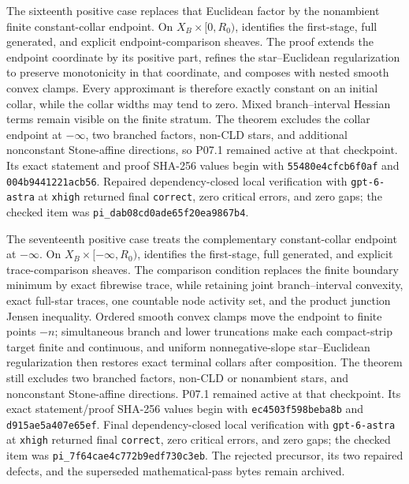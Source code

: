 The sixteenth positive case replaces that Euclidean factor by the
nonambient finite constant-collar endpoint.  On
\(X_B\times[0,R_0)\),
 identifies the
first-stage, full generated, and explicit endpoint-comparison sheaves.  The
proof extends the endpoint coordinate by its positive part, refines the
star--Euclidean regularization to preserve monotonicity in that coordinate,
and composes with nested smooth convex clamps.  Every approximant is
therefore exactly constant on an initial collar, while the collar widths may
tend to zero.  Mixed branch--interval Hessian terms remain visible on the
finite stratum.  The theorem excludes the collar endpoint at \(-\infty\), two
branched factors, non-CLD stars, and additional nonconstant Stone-affine
directions, so P07.1 remained active at that checkpoint.  Its exact statement and proof SHA-256
values begin with \texttt{55480e4cfcb6f0af} and
\texttt{004b9441221acb56}.  Repaired dependency-closed local verification
with \texttt{gpt-6-astra} at \texttt{xhigh} returned final
\texttt{correct}, zero critical errors, and zero gaps; the checked item was
\nolinkurl{pi_dab08cd0ade65f20ea9867b4}.

The seventeenth positive case treats the complementary constant-collar
endpoint at \(-\infty\).  On \(X_B\times[-\infty,R_0)\),
 identifies
the first-stage, full generated, and explicit trace-comparison sheaves.  The
comparison condition replaces the finite boundary minimum by exact
fibrewise trace, while retaining joint branch--interval convexity, exact
full-star traces, one countable node activity set, and the product junction
Jensen inequality.  Ordered smooth convex clamps move the endpoint to
finite points \(-n\); simultaneous branch and lower truncations make each
compact-strip target finite and continuous, and uniform nonnegative-slope
star--Euclidean regularization then restores exact terminal collars after
composition.  The theorem still excludes two branched factors, non-CLD or
nonambient stars, and nonconstant Stone-affine directions.  P07.1 remained active at that checkpoint.  Its exact statement/proof SHA-256 values begin with
\texttt{ec4503f598beba8b} and \texttt{d915ae5a407e65ef}.
Final dependency-closed local verification with \texttt{gpt-6-astra} at
\texttt{xhigh} returned final \texttt{correct}, zero critical errors, and
zero gaps; the checked item was
\nolinkurl{pi_7f64cae4c772b9edf730c3eb}.  The rejected precursor, its two
repaired defects, and the superseded mathematical-pass bytes remain
archived.

